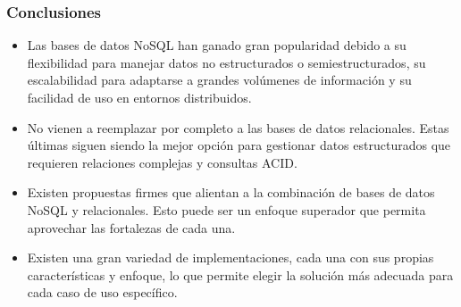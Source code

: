 \begin{frame}
    \frametitle{Conclusiones}

    \begin{itemize}
        \item Las bases de datos NoSQL han ganado gran popularidad debido a su flexibilidad para manejar datos no estructurados o semiestructurados, su escalabilidad para adaptarse a grandes volúmenes de información y su facilidad de uso en entornos distribuidos.

         
        
        \item No vienen a reemplazar por completo a las bases de datos relacionales. Estas últimas siguen siendo la mejor opción para gestionar datos estructurados que requieren relaciones complejas y consultas ACID.

         
        
        \item Existen propuestas firmes que alientan a la combinación de bases de datos NoSQL y relacionales. Esto puede ser un enfoque superador que permita aprovechar las fortalezas de cada una.

         

        \item Existen una gran variedad de implementaciones, cada una con sus propias características y enfoque, lo que permite elegir la solución más adecuada para cada caso de uso específico.
    \end{itemize}
    
\end{frame}